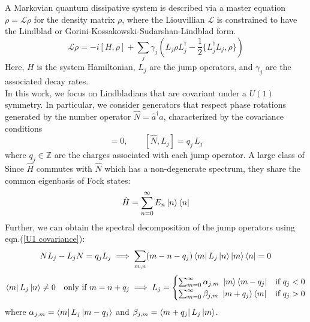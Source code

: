 \documentclass[11pt,a4paper]{article}
\begin{document}
A Markovian quantum dissipative system is described via a master equation $\dot{\rho} = \mathcal{L} \rho$ for the density matrix $\rho$,
where the Liouvillian $\mathcal{L}$ is constrained to have the Lindblad or Gorini-Kossakowski-Sudarshan-Lindblad form. 
\begin{equation}
    \mathcal{L} \rho = -i[H, \rho] + \sum_{j} \gamma_j \left( L_j \rho L_j^\dagger - \frac{1}{2} \{ L_j^\dagger L_j, \rho \} \right) \label{Lindblad master equation}
\end{equation}
Here, $H$ is the system Hamiltonian, $L_j$ are the jump operators, and $\gamma_j$ are the associated decay rates. \\
In this work, we focus on Lindbladians that are covariant under a $U(1)$ symmetry. 
In particular, we consider generators that respect phase rotations generated by 
the number operator $\hat{N} = \hat{a}^\dagger \hat{a}$, 
characterized by the covariance conditions
\begin{equation}
    [\hat{H},\hat{N}] = 0, \qquad [\hat{N},L_j] = q_j\, L_j \label{U1 covariance}
\end{equation}
where $q_j \in \mathbb{Z}$ are the charges associated with each jump operator\cite{albert2014symmetries,gu2024spontaneous}. A large class of 
Since $\hat{H}$ commutes with $\hat{N}$ which has a non-degenerate spectrum, they share the common eigenbasis of Fock states:
\begin{equation}
    \hat{H} = \sum_{n=0}^{\infty} E_n \ket{n}\bra{n} \label{Hamiltonian spectrum}
\end{equation}
Further, we can obtain the spectral decomposition of the jump operators using eqn.(\ref{U1 covariance}):
\begin{align}
    N L_j   -  L_j N = q_j L_j \implies \sum_{m,n} (m-n - q_j) \bra{m} L_j \ket{n} \ket{m}\bra{n} = 0 
\end{align}
\begin{align}
    \bra{m} L_j \ket{n} \neq 0 \quad \text{only if } m= n+ q_j \implies L_j = \begin{cases} \sum_{m=0}^{\infty} \alpha_{j,m} \ \ket{m}\bra{m-q_j}   &  \text{if } q_j < 0 \\ \sum_{m=0}^{\infty} \beta_{j,m} \ \ket{m+q_j}\bra{m} & \text{if } q_j > 0 \end{cases}                    \label{jump operator decomposition}
\end{align}
where $\alpha_{j,m} = \bra{m} L_j \ket{m-q_j}$ and $\beta_{j,m} = \bra{m+q_j} L_j \ket{m}$. \\
\end{document}
